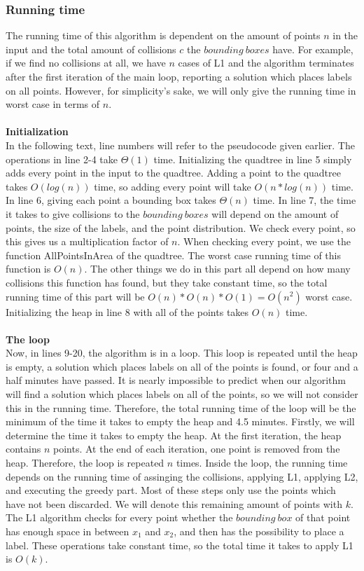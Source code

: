 \documentclass[crop=false,a4paper,oneside,11pt]{article}
\begin{document}
\subsubsection{Running time}
The running time of this algorithm is dependent on the amount of points $n$ in the input and the total amount of collisions $c$ the $bounding \ boxes$ have. For example, if we find no collisions at all, we have $n$ cases of L1 and the algorithm terminates after the first iteration of the main loop, reporting a solution which places labels on all points. However, for simplicity's sake, we will only give the running time in worst case in terms of $n$. \\ \\
\textbf{Initialization}\\
In the following text, line numbers will refer to the pseudocode given earlier. The operations in line 2-4 take $\Theta(1)$ time. Initializing the quadtree in line 5 simply adds every point in the input to the quadtree. Adding a point to the quadtree takes $O(log(n))$ time, so adding every point will take $O(n*log(n))$ time. In line 6, giving each point a bounding box takes $\Theta(n)$ time. In line 7, the time it takes to give collisions to the $bounding \ boxes$ will depend on the amount of points, the size of the labels, and the point distribution. We check  every point, so this gives us a multiplication factor of $n$. When checking every point, we use the function AllPointsInArea of the quadtree. The worst case running time of this function is $O(n)$. The other things we do in this part all depend on how many collisions this function has found, but they take constant time, so the total running time of this part will be $O(n)*O(n)*O(1) = O(n^2)$ worst case. Initializing the heap in line 8 with all of the points takes $O(n)$ time.  \\ \\
 \textbf{The loop} \\
Now, in lines 9-20, the algorithm is in a loop. This loop is repeated until the heap is empty, a solution which places labels on all of the points is found, or four and a half minutes have passed. It is nearly impossible to predict when our algorithm will find a solution which places labels on all of the points, so we will not consider this in the running time. Therefore, the total running time of the loop will be the minimum of the time it takes to empty the heap and 4.5 minutes. Firstly, we will determine the time it takes to empty the heap. At the first iteration, the heap contains $n$ points. At the end of each iteration, one point is removed from the heap. Therefore, the loop is repeated $n$ times. Inside the loop, the running time depends on the running time of assinging the collisions, applying L1, applying L2, and executing the greedy part. Most of these steps only use the points which have not been discarded. We will denote this remaining amount of points with $k$. \\ The L1 algorithm checks for every point whether the $bounding \ box$ of that point has enough space in between $x_1$ and $x_2$, and then has the possibility to place a label. These operations take constant time, so the total time it takes to apply L1 is $O(k)$. \\
\end{document}

